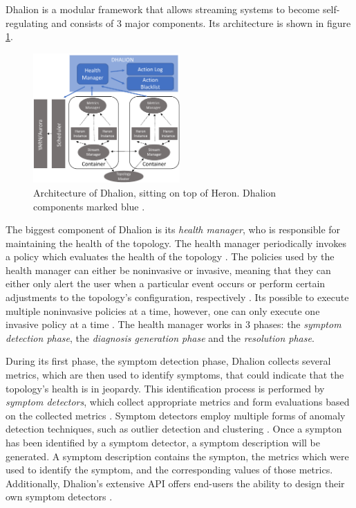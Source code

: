         \label{sub:dhalion-architecture}
        Dhalion is a modular framework that allows streaming systems to become self-regulating and consists of 3 major components.
        Its architecture is shown in figure \ref{fig:dhalion}.

        \begin{figure}[hbt]
            \centering
            \includegraphics[width=0.5\textwidth]{Bilder/dhalion.png}
            \caption{
                Architecture of Dhalion, sitting on top of Heron. Dhalion components marked blue \cite{dhalion}.
            }
            \label{fig:dhalion}
        \end{figure}

        \quad The biggest component of Dhalion is its \textit{health manager}, who is responsible for maintaining the health of the topology.
        The health manager periodically invokes a policy which evaluates the health of the topology \cite[p. 4]{dhalion}. 
        The policies used by the health manager can either be noninvasive or invasive, meaning that they can either only alert the user when a particular event occurs or 
        perform certain adjustments to the topology's configuration, respectively \cite[p. 4]{dhalion}. 
        Its possible to execute multiple noninvasive policies at a time, however, one can only execute one invasive policy at a time \cite[p. 4]{dhalion}.
        The health manager works in 3 phases: the \textit{symptom detection phase}, the \textit{diagnosis generation phase} and the \textit{resolution phase}.
        
        \quad During its first phase, the symptom detection phase, Dhalion collects several metrics, which are then used to identify symptoms, that could indicate that the 
        topology's health is in jeopardy.
        This identification process is performed by \textit{symptom detectors}, which collect appropriate metrics and form evaluations based on the collected metrics \cite[p. 4]{dhalion}.
        Symptom detectors employ multiple forms of anomaly detection techniques, such as outlier detection and clustering \cite[p. 4]{dhalion}.
        Once a sympton has been identified by a symptom detector, a symptom description will be generated. A symptom description contains the sympton, the metrics which
        were used to identify the symptom, and the corresponding values of those metrics.
        Additionally, Dhalion's extensive API offers end-users the ability to design their own symptom detectors \cite{dhalion}.
        
